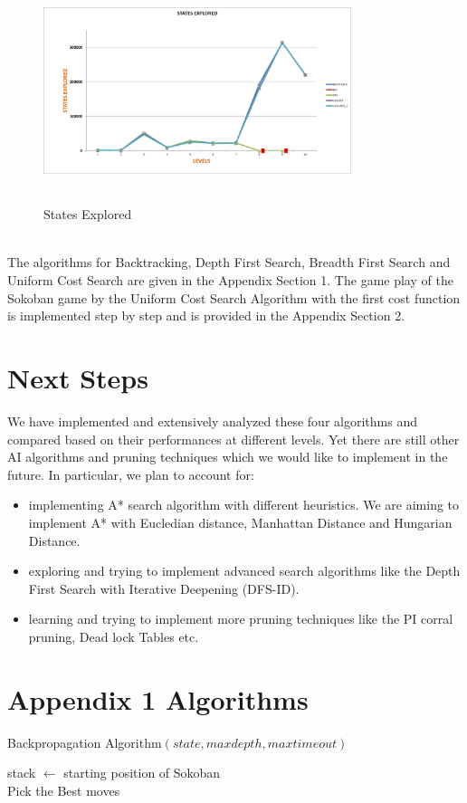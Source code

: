\documentclass[10pt, final]{article}
\newcommand{\br}[1][.75]{\ \\[#1\baselineskip]}
\begin{document}
	\begin{figure}[h!]
	\centering
	\includegraphics[width=9cm, height=6.5cm]{state_exp.png}
	\caption{States Explored}
\end{figure} \br
The algorithms for Backtracking, Depth First Search, Breadth First Search and Uniform Cost Search are given in the Appendix Section 1. The game play of the Sokoban game by the Uniform Cost Search Algorithm with the first cost function is implemented step by step and is provided in the Appendix Section 2.
	\section{Next Steps}
	We have implemented and extensively analyzed these four algorithms and compared based on their performances at different levels. Yet there are still other AI algorithms and pruning techniques which we would like to implement in the future. In particular, we plan to account for:
	\begin{itemize}
		\item implementing A* search algorithm with different heuristics. We are aiming to implement A* with Eucledian distance, Manhattan Distance and Hungarian Distance.
		\item exploring and trying to implement advanced search algorithms like the Depth First Search with Iterative Deepening (DFS-ID).
		\item learning and trying to implement more pruning techniques like the PI corral pruning, Dead lock Tables etc.
	\end{itemize}

	
	\newpage
	\section{Appendix 1 Algorithms}
	\begin{algorithm}\label{back}\small
	\caption{\small Backpropagation Algorithm$(state, maxdepth, maxtimeout)$}
	stack $\gets$ starting position of Sokoban \\
	Pick the Best moves
\end{algorithm}
\end{document}

